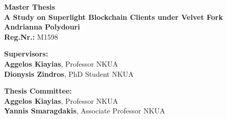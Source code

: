 \begin{center}
    \vspace{3cm}
    \large \textbf{Master Thesis}\\
    \vspace{3cm}
    \textbf{A Study on Superlight Blockchain Clients under Velvet Fork}\\
    \vspace{3cm}
    \large \textbf{Andrianna Polydouri}\\
    \textbf{Reg.Nr.:} M1598
 
    \begin{flushleft}
        \textbf{Supervisors:}\\ 
        \hspace{2cm}
        \textbf{Aggelos Kiayias}, Professor NKUA\\
        \hspace{2cm}
        \textbf{Dionysis Zindros}, PhD Student NKUA

        \textbf{Thesis Committee:}\\ 
        \hspace{2cm}
        \textbf{Aggelos Kiayias}, Professor NKUA\\
        \hspace{2cm}
        \textbf{Yannis Smaragdakis}, Associate Professor NKUA

    \end{flushleft}
\end{center}


\pagebreak